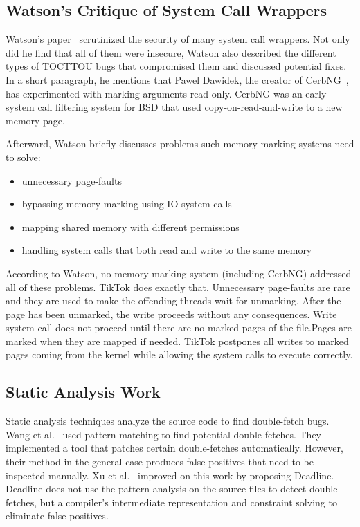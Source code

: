 \documentclass[conference]{IEEEtran}
\newcommand{\sysname}{TikTok}
\begin{document}
\subsection{Watson's Critique of System Call Wrappers}
\label{subsec:watson}
Watson's paper~\cite{watson2007exploiting} scrutinized the security of many
system call wrappers. Not only did he find that all of them were insecure,
Watson also described the different types of TOCTTOU bugs that compromised them
and discussed potential fixes. In a short paragraph, he mentions that Pawel
Dawidek, the creator of CerbNG~\cite{zak_frasunek_dawidek}, has experimented
with marking arguments read-only. CerbNG was an early system call filtering
system for BSD that used copy-on-read-and-write to a new memory page.

Afterward, Watson briefly discusses problems such memory marking systems
need to solve: 
\begin{itemize}
    \item unnecessary page-faults
    \item bypassing memory marking using IO system calls
    \item mapping shared memory with different permissions
    \item handling system calls that both read and write to the same memory
\end{itemize}

According to Watson, no memory-marking system (including CerbNG) addressed all
of these problems. \sysname{} does exactly that. Unnecessary page-faults are
rare and they are used to make the offending threads wait for unmarking. After
the page has been unmarked, the write proceeds without any consequences. Write
system-call does not proceed until there are no marked pages of the file.Pages
are marked when they are mapped if needed. \sysname{} postpones all writes to
marked pages coming from the kernel while allowing the system calls to execute
correctly.

\subsection{Static Analysis Work}
\label{subsec:dfstatic}
Static analysis techniques analyze the source code to find double-fetch bugs.
Wang et al.~\cite{wang2017double} used pattern matching to find potential
double-fetches. They implemented a tool that patches certain double-fetches
automatically. However, their method in the general case produces false
positives that need to be inspected manually. Xu et al.~\cite{xu2018precise}
improved on this work by proposing Deadline. Deadline does not use the pattern 
analysis on the source files to detect double-fetches, but a compiler's
intermediate representation and constraint solving to eliminate false positives.
\end{document}
